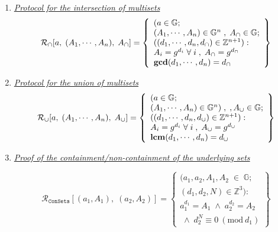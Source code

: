 \documentclass[11pt, lettersize, notitlepage, leqno, footskip=0.6cm]{article}
\newcommand{\bz}{\mathbb Z}
\newcommand{\ttt}{\texttt}
\newcommand{\bG}{\mathbb{G}}
\newcommand{\sett}{\ttt{Set}}
\newcommand{\mc}{\mathcal}
\newcommand{\mb}{\mathbb}
\newcommand{\mbf}{\mathbf}
\newcommand{\sub}{\subseteq}
\newcommand{\mcM}{\mc{M}}
\newcommand{\vs}{\vspace{-0.15cm}}
\newcommand{\noin}{\noindent}
\newcommand{\Mod}[1]{\ (\mathrm{mod}\ #1)}
\newcommand{\LCM}{\mbf{lcm}}
\newcommand{\GCD}{\mbf{gcd}}
\numberwithin{equation}{section}
\begin{document}
{{{\begin{enumerate}[wide, labelwidth=!, labelindent=0pt]
\item \hyperlink{Int}{\textit{Protocol for the intersection of multisets}} \vs \[
  \mc{R}_{\tt{\cap}}[a,\; (A_1,\cdots,A_n),\; A_{\tt{\cap}}] = \left\{\begin{array}{l}
    (a\in\mb{G};\;\\
     (A_1,\cdots,A_n)\in\mb{G}^{n}\;,\; A_{\tt{\cap}}\in\bG;\\
    ((d_1,\cdots,d_n, d_{\tt{\cap}})\in\bz^{n+1}): \\
    A_i = g^{d_i}\;\forall\;i\;,\; A_{\tt{\cap}} = g^{d_{\tt{\cap}}}   \\
    
  \GCD(d_1, \cdots, d_n) = d_{\tt{\cap}}
  \end{array}\right\}
\] 

\item \hyperlink{Uni}{\textit{Protocol for the union of multisets }}\vs \[
  \mc{R}_{\tt{\cup}}[a,\; (A_1,\cdots,A_n),\; A_{\tt{\cup}}] = \left\{\begin{array}{l}
    (a\in\mb{G};\;\\
     (A_1,\cdots,A_n)\in \mb{G}^{n})\;,\;,A_{\tt{\cup}}\in\mb{G};\\
    ((d_1,\cdots,d_n, d_{\tt{\cup}})\in\bz^{n+1}): \\
    A_i = g^{d_i}\;\forall\;i\;,\; A_{\tt{\cup}} = g^{d_{\tt{\cup}}}   \\
    
  \LCM(d_1, \cdots, d_n) = d_{\tt{\cup}}
  \end{array}\right\}
\] 

\item \hyperlink{Sets}{\textit{Proof of the containment/non-containment of the underlying sets}}\vspace{-0.3cm}


\[
  \mc{R}_{\ttt{ConSets}}[(a_1, A_1),\;(a_2,A_2)] = \left\{\begin{array}{l}
    (a_1,a_2, A_1, A_2\;\in\;\mb{G}; \\
    (d_1, d_2, N) \in \bz^3):   \\
    a_1^{d_1} = A_1\;\wedge\;a_2^{d_2} = A_2\\
    \;\wedge\;d_2^{N}\equiv 0\Mod{d_1} 
  \end{array}\right\}
\]




\end{enumerate}}}}
\end{document}
